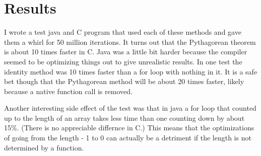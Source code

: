 \documentclass[12pt,a4paper,twoside]{article}  %
\begin{document}
\section{Results}

I wrote a test java and C program that used each of these methods and
gave them a whirl for 50 million iterations. It turns out that the
Pythagorean theorem is about 10 times faster in C. Java was a little
bit harder because the compiler seemed to be optimizing things out to
give unrealistic results. In one test the identity method was 10 times
faster than a for loop with nothing in it. It is a safe bet though
that the Pythagorean method will be about 20 times faster, likely
because a native function call is removed.

Another interesting side effect of the test was that in java a for
loop that counted up to the length of an array takes less time than
one counting down by about 15\%. (There is no appreciable differnce in
C.) This means that the optimizations of going from the length - 1 to
0 can actually be a detriment if the length is not determined by a
function.
\end{document}
